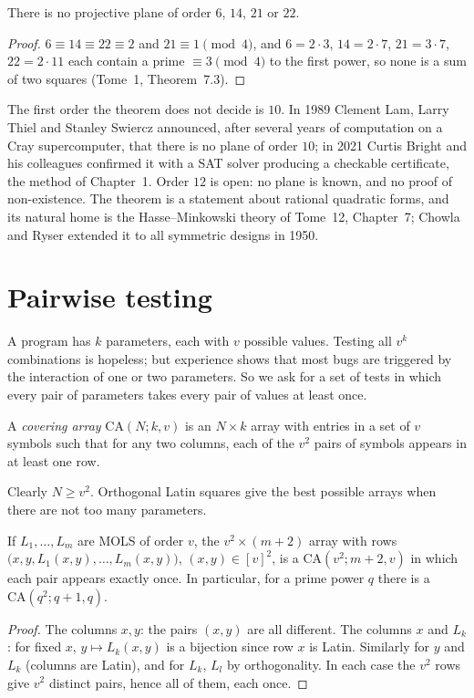 \begin{corollary}\label{cor:no6}
There is no projective plane of order $6$, $14$, $21$ or $22$.
\end{corollary}
\begin{proof}
$6\equiv14\equiv22\equiv2$ and $21\equiv1\pmod4$, and $6=2\cdot3$, $14=2\cdot7$, $21=3\cdot7$, $22=2\cdot11$ each contain a prime $\equiv3\pmod4$ to the first power, so none is a sum of two squares (Tome~1,
Theorem~7.3).
\end{proof}

The first order the theorem does not decide is $10$. In 1989 Clement Lam, Larry Thiel and Stanley Swiercz announced, after several years of computation on a Cray supercomputer, that there is no
plane of order $10$; in 2021 Curtis Bright and his colleagues confirmed it with a SAT solver producing a checkable certificate, the method of Chapter~1. Order $12$ is open: no plane is known, and no proof
of non-existence. The theorem is a statement about rational quadratic forms, and its natural home is the Hasse--Minkowski theory of Tome~12, Chapter~7; Chowla and Ryser extended it to all symmetric designs in 1950.

\section{Pairwise testing}

A program has $k$ parameters, each with $v$ possible values. Testing all $v^k$ combinations is hopeless; but experience shows that most bugs are triggered by the interaction of one or two
parameters. So we ask for a set of tests in which every pair of parameters takes every pair of values at least once.

\begin{definition}\label{def:ca}
A \emph{covering array} $\mathrm{CA}(N;k,v)$ is an $N\times k$ array with entries in a set of $v$ symbols such that for any two columns, each of the $v^2$ pairs of symbols appears in at least one row.
\end{definition}

Clearly $N\ge v^2$. Orthogonal Latin squares give the best possible arrays when there are not too many parameters.

\begin{proposition}\label{prop:camols}
If $L_1,\dots,L_{m}$ are MOLS of order $v$, the $v^2\times(m+2)$ array with rows $\bigl(x,y,L_1(x,y),\dots,L_m(x,y)\bigr)$, $(x,y)\in[v]^2$, is a $\mathrm{CA}(v^2;m+2,v)$ in which each pair appears exactly
once. In particular, for a prime power $q$ there is a $\mathrm{CA}(q^2;q+1,q)$.
\end{proposition}
\begin{proof}
The columns $x,y$: the pairs $(x,y)$ are all different. The columns $x$ and $L_k$: for fixed $x$, $y\mapsto L_k(x,y)$ is a bijection since row $x$ is Latin. Similarly for $y$ and $L_k$ (columns are Latin), and for
$L_k$, $L_l$ by orthogonality. In each case the $v^2$ rows give $v^2$ distinct pairs, hence all of them, each once.
\end{proof}

